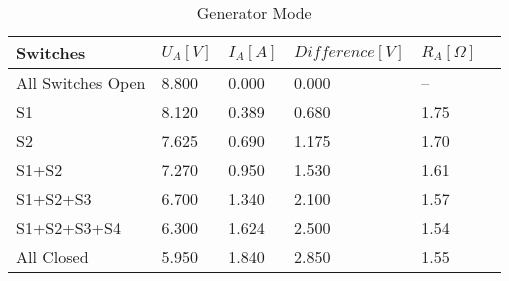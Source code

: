 \begin{table}[htbp]
   \centering
   \begin{tabularx}{\columnwidth}{XXXXXX}
      \toprule
      Switches          & $U_A[V]$ & $I_A[A]$ & $Difference[V]$ & $R_A[\Omega]$ \\
      \midrule
      All Switches Open & 8.800    & 0.000    & 0.000           & --            \\
      S1                & 8.120    & 0.389    & 0.680           & 1.75          \\
      S2                & 7.625    & 0.690    & 1.175           & 1.70          \\
      S1+S2             & 7.270    & 0.950    & 1.530           & 1.61          \\
      S1+S2+S3          & 6.700    & 1.340    & 2.100           & 1.57          \\
      S1+S2+S3+S4       & 6.300    & 1.624    & 2.500           & 1.54          \\
      All Closed        & 5.950    & 1.840    & 2.850           & 1.55          \\
      \bottomrule
   \end{tabularx}
   \caption{Generator Mode}
   \label{tab:Generator_4000_Idle_Mode}
\end{table}
